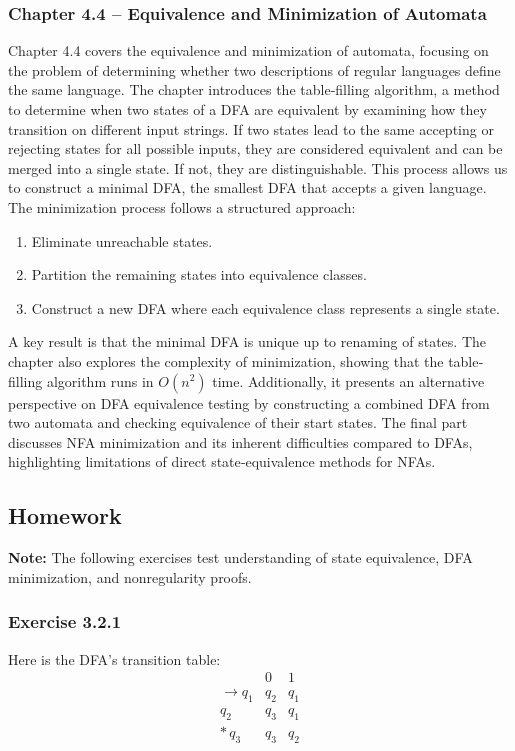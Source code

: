 \documentclass{article}
\theoremstyle{theorem}
\theoremstyle{definition}
\theoremstyle{remark}
\begin{document}
\subsubsection*{Chapter 4.4 – Equivalence and Minimization of Automata}
Chapter 4.4 covers the equivalence and minimization of automata, focusing on the problem of determining whether two descriptions of regular languages define the same language. The chapter introduces the table‐filling algorithm, a method to determine when two states of a DFA are equivalent by examining how they transition on different input strings. If two states lead to the same accepting or rejecting states for all possible inputs, they are considered equivalent and can be merged into a single state. If not, they are distinguishable. This process allows us to construct a minimal DFA, the smallest DFA that accepts a given language. The minimization process follows a structured approach:
\begin{enumerate}
  \item Eliminate unreachable states.
  \item Partition the remaining states into equivalence classes.
  \item Construct a new DFA where each equivalence class represents a single state.
\end{enumerate}
A key result is that the minimal DFA is unique up to renaming of states. The chapter also explores the complexity of minimization, showing that the table‐filling algorithm runs in \(O(n^2)\) time. Additionally, it presents an alternative perspective on DFA equivalence testing by constructing a combined DFA from two automata and checking equivalence of their start states. The final part discusses NFA minimization and its inherent difficulties compared to DFAs, highlighting limitations of direct state‐equivalence methods for NFAs.

\subsection{Homework}
\textbf{Note:} The following exercises test understanding of state equivalence, DFA minimization, and nonregularity proofs.

\subsubsection*{Exercise 3.2.1}
Here is the DFA’s transition table:
\[
\begin{array}{c|cc}
     &0&1\\\hline
\to q_1 & q_2 & q_1\\
      q_2 & q_3 & q_1\\
*\,q_3 & q_3 & q_2
\end{array}
\]
\end{document}

